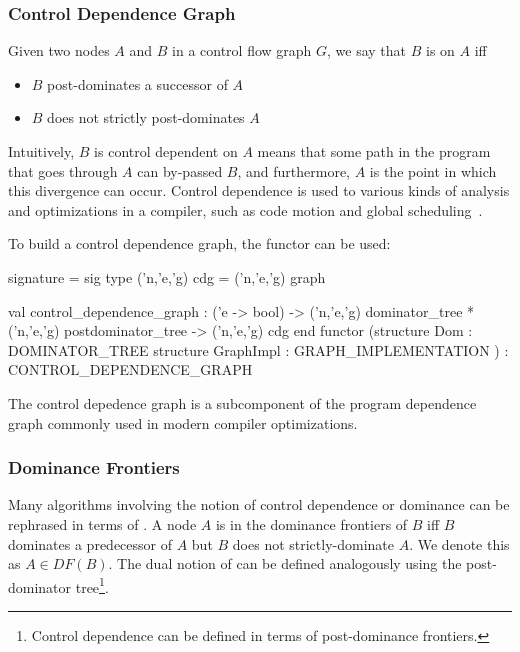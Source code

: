 \subsubsection{Control Dependence Graph}
Given two nodes $A$ and $B$ in a control flow graph $G$, 
we say that $B$ is  on $A$ iff
\begin{itemize}
  \item $B$ post-dominates a successor of $A$
  \item $B$ does not strictly post-dominates $A$
\end{itemize}
Intuitively, $B$ is control dependent on $A$ means that
some path in the program that goes through $A$ can by-passed $B$,
and furthermore, $A$ is the point in which this divergence can occur.
Control dependence is used to various kinds of analysis and optimizations in
a compiler, such as code motion and global scheduling~\cite{bernstein-rodeh}.

To build a control dependence graph, the functor
 can be used:
\begin{SML}
 signature  = sig
    type ('n,'e,'g) cdg = ('n,'e,'g) graph

    val control_dependence_graph :
          ('e -> bool) ->
          ('n,'e,'g) dominator_tree *
          ('n,'e,'g) postdominator_tree ->
          ('n,'e,'g) cdg
 end
 functor 
    (structure Dom : DOMINATOR_TREE
     structure GraphImpl : GRAPH_IMPLEMENTATION
    ) : CONTROL_DEPENDENCE_GRAPH
\end{SML}
The control depedence graph is a subcomponent of the
program dependence graph commonly used in
modern compiler optimizations.

\subsubsection{Dominance Frontiers}

Many algorithms involving the notion of control dependence or dominance
can be rephrased in terms of .
A node $A$ is in the dominance frontiers of $B$ iff
$B$ dominates a predecessor of $A$ but $B$ does not strictly-dominate $A$.
We denote this as $A \in DF(B)$. 
The dual notion of  can be defined
analogously using the post-dominator tree\footnote{Control dependence
can be defined in terms of post-dominance frontiers.}.  

